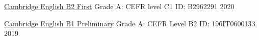 

\begin{cvhonors}

  \cvhonor
    {\underline{\href{https://www.cambridgeenglish.org/exams-and-tests/first/}{Cambridge English B2 First}}} %
    {Grade A: CEFR level C1} %
    {ID: B2962291} %
    {2020} %

  \cvhonor
    {\underline{\href{https://www.cambridgeenglish.org/exams-and-tests/preliminary/}{Cambridge English B1 Preliminary}}} %
    {Grade A: CEFR Level B2} %
    {ID: 196IT0600133} %
    {2019} %

\end{cvhonors}
